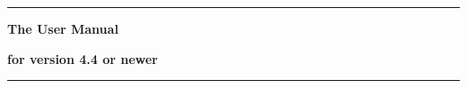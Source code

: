 \thispagestyle{empty}
\begin{titlepage}


\rule{\linewidth}{0.5mm}
  \Large
  \textbf{The \aevol{} User Manual}

  \vspace{0.5cm}
   
  \normalsize
  \textbf{for version 4.4 or newer}

 \rule{\linewidth}{0.5mm}
 
\end{titlepage}

\clearemptydoublepage